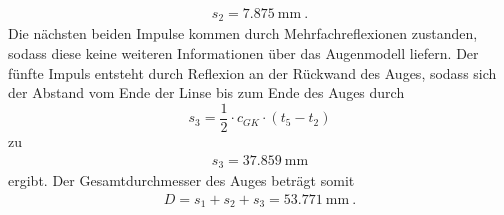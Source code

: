 \begin{align*}
  s_2 = \SI{7.875}{\milli\meter} \: .
\end{align*}
Die nächsten beiden Impulse kommen durch Mehrfachreflexionen zustanden, sodass diese
keine weiteren Informationen über das Augenmodell liefern. Der fünfte Impuls entsteht
durch Reflexion an der Rückwand des Auges, sodass sich der Abstand vom Ende der
Linse bis zum Ende des Auges durch
\begin{equation}
  s_3 = \frac{1}{2} \cdot c_{GK} \cdot (t_5-t_2)
\end{equation}
zu
\begin{align*}
  s_3 = \SI{37.859}{\milli\meter}
\end{align*}
ergibt.
Der Gesamtdurchmesser des Auges beträgt somit
\begin{align*}
  D = s_1 + s_2 + s_3 = \SI{53.771}{\milli\meter} \: .
\end{align*}
